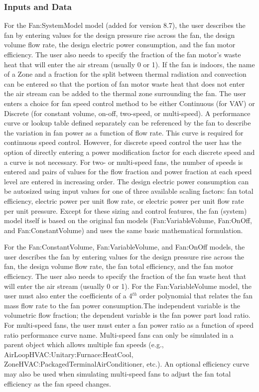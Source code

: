 \subsubsection{Inputs and Data}\label{inputs-and-data-000}

For the Fan:SystemModel model (added for version 8.7), the user describes the fan by entering values for the design pressure rise across the fan, the design volume flow rate, the design electric power consumption, and the fan motor efficiency. The user also needs to specify the fraction of the fan motor's waste heat that will enter the air stream (usually 0 or 1). If the fan is indoors, the name of a Zone and a fraction for the split between thermal radiation and convection can be entered so that the portion of fan motor waste heat that does not enter the air stream can be added to the thermal zone surrounding the fan. The user enters a choice for fan speed control method to be either Continuous (for VAV) or Discrete (for constant volume, on-off, two-speed, or multi-speed).  A performance curve or lookup table defined separately can be referenced by the fan to describe the variation in fan power as a function of flow rate. This curve is required for continuous speed control. However, for discrete speed control the user has the option of directly entering a power modification factor for each discrete speed and a curve is not necessary. For two- or multi-speed fans, the number of speeds is entered and pairs of values for the flow fraction and power fraction at each speed level are entered in increasing order. The design electric power consumption can be autosized using input values for one of three available scaling factors: fan total efficiency, electric power per unit flow rate, or electric power per unit flow rate per unit pressure.  Except for these sizing and control features, the fan (system) model itself is based on the original fan models (Fan:VariableVolume, Fan:OnOff, and Fan:ConstantVolume) and uses the same basic mathematical formulation.

For the Fan:ConstantVolume, Fan:VariableVolume, and Fan:OnOff models, the user describes the fan by entering values for the design pressure rise across the fan, the design volume flow rate, the fan total efficiency, and the fan motor efficiency. The user also needs to specify the fraction of the fan waste heat that will enter the air stream (usually 0 or 1). For the Fan:VariableVolume model, the user must also enter the coefficients of a 4\(^{th}\) order polynomial that relates the fan mass flow rate to the fan power consumption.The independent variable is the volumetric flow fraction; the dependent variable is the fan power part load ratio. For multi-speed fans, the user must enter a fan power ratio as a function of speed ratio performance curve name. Multi-speed fans can only be simulated in a parent object which allows multiple fan speeds (e.g., AirLoopHVAC:Unitary:Furnace:HeatCool, ZoneHVAC:PackagedTerminalAirConditioner, etc.). An optional efficiency curve may also be used when simulating multi-speed fans to adjust the fan total efficiency as the fan speed changes.

